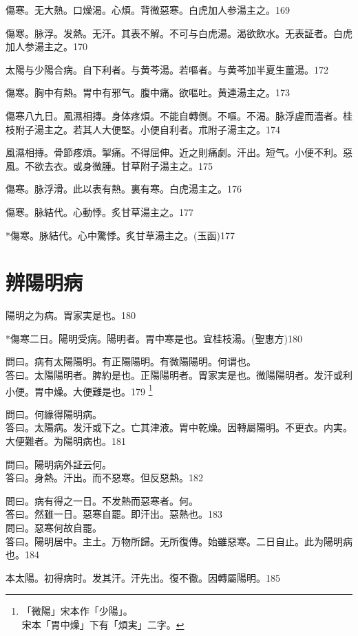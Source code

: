 \documentclass[b5paper,twoside,zihao=-4,UTF8]{ctexbook}
\begin{document}
傷寒。无大熱。口燥渴。心煩。背微惡寒。白虎{加人参}湯主之。169

傷寒。脉浮。发熱。无汗。其表不解。不可与白虎湯。渴欲飲水。无表証者。白虎{加人参}湯主之。170

太陽与少陽合病。自下利者。与黄芩湯。若嘔者。与黄芩加半夏生薑湯。172

傷寒。胸中有熱。胃中有邪气。腹中痛。欲嘔吐。黄連湯主之。173

傷寒八九日。風濕相摶。身体疼煩。不能自轉側。不嘔。不渴。脉浮虗而濇者。桂枝附子湯主之。若其人大便堅。小便自利者。朮附子湯主之。174

風濕相摶。骨節疼煩。掣痛。不得屈伸。近之則痛劇。汗出。短气。小便不利。惡風。不欲去衣。或身微腫。甘草附子湯主之。175

傷寒。脉浮滑。此以表有熱。裏有寒。白虎湯主之。176

傷寒。脉結代。心動悸。炙甘草湯主之。177

*傷寒。脉結代。心中驚悸。炙甘草湯主之。(玉函)177

\chapter{辨陽明病}

陽明之为病。胃家実是也。180

*傷寒二日。陽明受病。陽明者。胃中寒是也。宜桂枝湯。(聖惠方)180

問曰。病有太陽陽明。有正陽陽明。有微陽陽明。何谓也。\\
答曰。太陽陽明者。脾約是也。正陽陽明者。胃家実是也。微陽陽明者。发汗或利小便。胃中燥。大便難是也。179
	\footnote{「微陽」宋本作「少陽」。\\宋本「胃中燥」下有「煩実」二字。}

問曰。何緣得陽明病。\\
答曰。太陽病。发汗或下之。亡其津液。胃中乾燥。因轉屬陽明。不更衣。内実。大便難者。为陽明病也。181

問曰。陽明病外証云何。\\
答曰。身熱。汗出。而不惡寒。{但}反惡熱。182

問曰。病有得之一日。不发熱而惡寒者。何。\\
答曰。然雖一日。惡寒自罷。即汗出。惡熱也。183\\
問曰。惡寒何故自罷。\\
答曰。陽明居中。主土。万物所歸。无所復傳。始雖惡寒。二日自止。此为陽明病也。184

本太陽。初得病时。发其汗。汗先出{。復}不徹。因轉屬陽明。185
\end{document}

